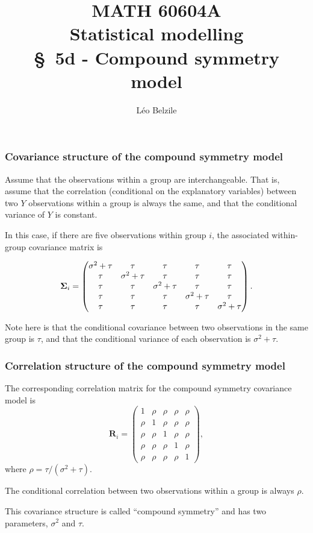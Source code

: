 \documentclass{beamer}
\title[\color{white}{MATH 60604A \S~5d - Compound symmetry model}]{\texorpdfstring{MATH 60604A \\Statistical modelling \\ \S~5d - Compound symmetry model}{MATH 60604A \\Statistical modelling \\ \S~5d - Compound symmetry model}}
\author{Léo Belzile}
\institute{HEC Montréal\\
Department of Decision Sciences}
\date{}
\begin{document}
\frame{\titlepage}


\begin{frame}
\frametitle{Covariance structure of the compound symmetry model}
\bi
\item Assume that the observations within a group are interchangeable. That is, 
assume that the correlation (conditional on the explanatory variables) between two $Y$ observations within a group is always the same, and that the conditional variance of $Y$ is constant.
\item In this case, if there are five observations within group $i$, the associated within-group covariance matrix is

{\small \[
\boldsymbol {\Sigma}_i=
  \begin{pmatrix}
    \sigma^2+\tau & \tau & \tau & \tau & \tau\\
    \tau & \sigma^2+\tau & \tau& \tau & \tau\\
    \tau & \tau & \sigma^2+\tau & \tau & \tau\\
    \tau & \tau & \tau & \sigma^2+\tau & \tau\\
    \tau & \tau & \tau & \tau & \sigma^2+\tau
  \end{pmatrix}.
\]
}
\item Note here is that the conditional covariance between two observations in the same group is $\tau$, and that the conditional variance of each observation is $\sigma^2+\tau$.
\ei
\end{frame}

\begin{frame}
\frametitle{Correlation structure of the compound symmetry model}
The corresponding correlation matrix for the compound symmetry covariance model is
\[
\mathbf{R}_i=
  \begin{pmatrix}
   1 & \rho & \rho & \rho & \rho\\
    \rho &1 & \rho & \rho & \rho\\
   \rho & \rho & 1 &\rho & \rho\\
   \rho & \rho & \rho & 1 &\rho\\
   \rho & \rho & \rho & \rho &1
  \end{pmatrix},
\]
where $\rho=\tau/(\sigma^2+\tau)$.
\bi
\item The conditional correlation between two observations within a group
is always $\rho$. 
\item This covariance structure is called ``\alert{compound symmetry}'' and has two parameters, $\sigma^2$ and $\tau$.
\ei
\end{frame}
\end{document}
